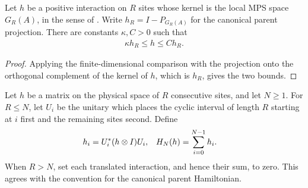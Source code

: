 \begin{lemma}
    \label{thm:parent-interaction-comparison}
    \leanok
    Let $h$ be a positive interaction on $R$ sites whose kernel is the local
    MPS space $G_R(A)$, in the sense of
    \cite[Section IV.C]{Cirac2021Matrix}. Write $h_R=I-P_{G_R(A)}$ for the
    canonical parent projection. There are constants $\kappa,C>0$ such that
    \begin{align}
        \kappa h_R\leq h\leq Ch_R.
    \end{align}
\end{lemma}
\begin{proof}\leanok
    Applying the finite-dimensional comparison with the projection onto the
    orthogonal complement of the kernel of $h$, which is $h_R$, gives the two
    bounds.
\end{proof}

\begin{definition}
    \label{def:periodic-fixed-interaction}
    \leanok
    Let $h$ be a matrix on the physical space of $R$ consecutive sites, and let $N\ge1$. For
    $R\leq N$, let $U_i$ be the unitary which places the cyclic interval
    of length $R$ starting at $i$ first and the remaining sites second.
    Define
    \begin{align}
        h_i    & =U_i^*(h\otimes I)U_i,      &
        H_N(h) & =\sum_{i=0}^{N-1}h_i.\notag
    \end{align}
    When $R>N$, set each translated interaction, and hence their sum, to
    zero. This agrees with the convention for the canonical parent Hamiltonian.
\end{definition}

